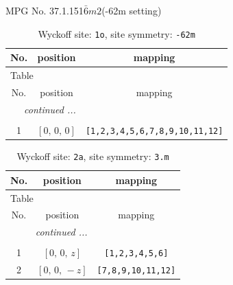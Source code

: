 \documentclass[fleqn,8pt]{jsarticle}
\begin{document}
\setcounter{MaxMatrixCols}{32}

\renewcommand{\tablename}{Table~}
\renewcommand{\figurename}{Figure~}
\begin{center}
\LARGE
MPG No. 37.1.151\quad$\bar{6}m2$\quad(-62m setting)
\end{center}
\renewcommand{\arraystretch}{1.2}
\begin{longtable}{ccc}
\caption{Wyckoff site: {\tt 1o}, site symmetry: {\tt -62m}}
 \\
 \hline \hline
No. & position & mapping \\ \hline \endfirsthead

\multicolumn{2}{l}{\tablename\ \thetable{}} \\
 \hline \hline
No. & position & mapping \\ \hline \endhead

 \hline \hline
\multicolumn{2}{r}{\footnotesize\it continued ...} \\ \endfoot

 \hline \hline
\multicolumn{2}{r}{} \\ \endlastfoot

1 & $\left[ 0,\, 0,\, 0 \right]$ & {\tt [1,2,3,4,5,6,7,8,9,10,11,12]} \\
\end{longtable}
\renewcommand{\arraystretch}{1.2}
\begin{longtable}{ccc}
\caption{Wyckoff site: {\tt 2a}, site symmetry: {\tt 3.m}}
 \\
 \hline \hline
No. & position & mapping \\ \hline \endfirsthead

\multicolumn{2}{l}{\tablename\ \thetable{}} \\
 \hline \hline
No. & position & mapping \\ \hline \endhead

 \hline \hline
\multicolumn{2}{r}{\footnotesize\it continued ...} \\ \endfoot

 \hline \hline
\multicolumn{2}{r}{} \\ \endlastfoot

1 & $\left[ 0,\, 0,\, z \right]$ & {\tt [1,2,3,4,5,6]} \\ \hline
2 & $\left[ 0,\, 0,\, - z \right]$ & {\tt [7,8,9,10,11,12]} \\
\end{longtable}
\renewcommand{\arraystretch}{1.2}
\end{document}

